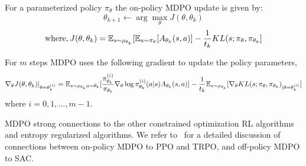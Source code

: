 For a parameterized policy $ \pi_{\theta}$ the on-policy MDPO update is given by: $$ \theta_{k+1}
	\leftarrow \arg \max_{\theta} J(\theta, \theta_k)$$ $$ \text{where}, J(\theta, \theta_k) = \mathbb{E}_{s
		\sim \rho_{\theta_k}} [ \mathbb{E}_{a \sim \pi_\theta}[A_{\theta_k}(s,a)] - \frac{1}{t_k} KL(s; \pi_\theta,
		\pi_{\theta_k}]$$

For $m$ steps MDPO uses the following gradient to update the
policy parameters,
\begin{equation}
	\label{eqn:mdpograd} \nabla_{\theta} J(\theta,
	\theta_k)|_{\theta = \theta_k^{(i)}} = \mathbb{E}_{s \sim \rho_{\theta_k} \\ a \sim \theta_k} [ \frac{
			\pi_{\theta_k}^{(i)}}{ \pi_{\theta_k}} \nabla_{\theta} \log \pi_{\theta_k}^{(i)} (a|s)
		A_{\theta_k}(s,a)] - \frac{1}{t_k} \mathbb{E}_{s \sim \rho_{\theta_k}} [\nabla_\theta KL(s; \pi_\theta,
		\pi_{\theta_k})_{|\theta= \theta_k^{(i)}}]
\end{equation} where $i=0,1,\ldots,m-1$.






MDPO strong connections to the other constrained optimization RL algorithms and entropy regularized
algorithms.
We refer to~ \cite{tomarMirror2022} for a detailed discussion of connections between on-policy MDPO
to PPO and TRPO, and off-policy MDPO to SAC.


